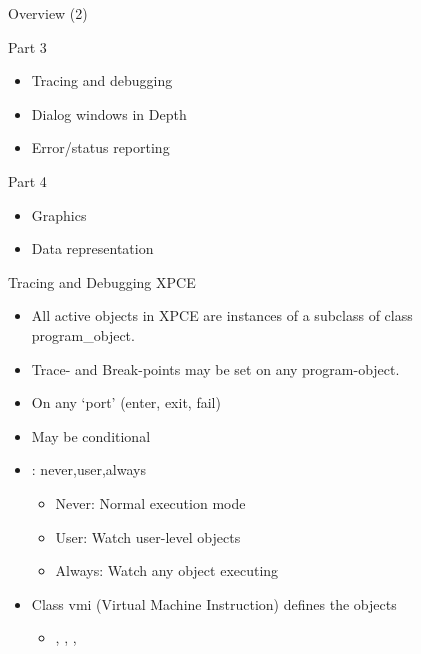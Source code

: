 
\begin{sli}{Overview (2)}

Part 3

\begin{itemize}
    \item Tracing and debugging
    \item Dialog windows in Depth
    \item Error/status reporting
\end{itemize}

Part 4

\begin{itemize}
    \item Graphics
    \item Data representation
\end{itemize}
\end{sli}




\begin{sli}{Tracing and Debugging XPCE}

\begin{itemize}
    \item All active objects in XPCE are instances of a subclass of
    	  class program_object.
    \item Trace- and Break-points may be set on any program-object.
    \item On any `port' (enter, exit, fail)
    \item May be conditional
    \item {} : {never,user,always}
    \begin{itemize}
        \item Never:  Normal execution mode
	\item User:   Watch user-level objects
	\item Always: Watch any object executing
    \end{itemize}
    \item Class vmi (Virtual Machine Instruction) defines the objects
    \begin{itemize}
        \item {}, , , 
    \end{itemize}
\end{itemize}
\end{sli}

